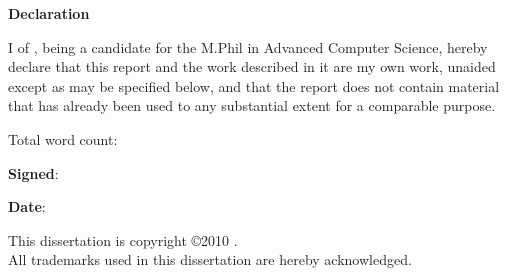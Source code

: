 \newpage
{\Huge \bf Declaration}

\vspace{24pt}

I \authorname of \authorcollege, being a candidate for the M.Phil in
Advanced Computer Science, hereby declare that this report and the
work described in it are my own work, unaided except as may be
specified below, and that the report does not contain material that
has already been used to any substantial extent for a comparable
purpose.

\vspace{24pt}
Total word count: \wordcount

\vspace{60pt}
\textbf{Signed}:

\vspace{12pt}
\textbf{Date}:


\vfill

This dissertation is copyright \copyright 2010 \authorname.
\\
All trademarks used in this dissertation are hereby acknowledged.



\newpage
\vspace*{\fill}
